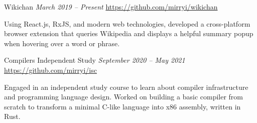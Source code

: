 \documentclass[letterpaper,11pt]{article}
\begin{document}
  \begin{rsectionlist}
    \rsectionitem
      {Wikichan}
      {\small\itshape March 2019 -- Present}
      {\small \url{https://github.com/mirryi/wikichan}}
      {}

      Using React.js, RxJS, and modern web technologies, developed a cross-platform browser
      extension that queries Wikipedia and displays a helpful summary popup when hovering over a
      word or phrase.

    \rsectionitem
      {Compilers Independent Study}
      {\small\itshape September 2020 -- May 2021}
      {\small \url{https://github.com/mirryi/isc}}
      {}

      Engaged in an independent study course to learn about compiler infrastructure and programming
      language design. Worked on building a basic compiler from scratch to transform a minimal
      C-like language into x86 assembly, written in Rust.
  \end{rsectionlist}
\end{document}
